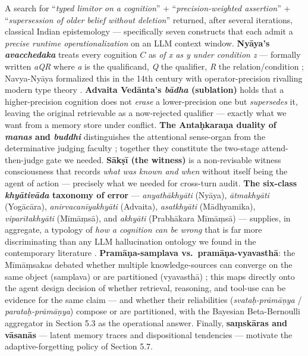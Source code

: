 A search for ``\emph{typed limitor on a cognition}'' + ``\emph{precision-weighted assertion}'' + ``\emph{supersession of older belief without deletion}'' returned, after several iterations, classical Indian epistemology --- specifically seven constructs that each admit a \emph{precise runtime operationalization} on an LLM context window. \textbf{Nyāya's \emph{avacchedaka}} treats every cognition \(C\) as \emph{of x as y under condition z} --- formally written \emph{aQR} where \emph{a} is the qualificand, \emph{Q} the qualifier, \emph{R} the relation/condition \citep{matilal1986perception, matilal1968navyanyaya, ingalls1951materials, phillips2012epistemology, gangesa14tattvacintamani}; Navya-Nyāya formalized this in the 14th century with operator-precision rivalling modern type theory \citep{ganeri2001philosophy, guha1968navyanyaya, ingalls1951materials}. \textbf{Advaita Vedānta's \emph{bādha} (sublation)} holds that a higher-precision cognition does not \emph{erase} a lower-precision one but \emph{supersedes} it, leaving the original retrievable as a now-rejected qualifier \citep{deutsch1969advaita, dharmaraja17vedantaparibhasa, shaw1990bada, rambachan2006advaita} --- exactly what we want from a memory store under conflict. \textbf{The Antaḥkaraṇa duality of \emph{manas} and \emph{buddhi}} distinguishes the attentional sense-organ from the determinative judging faculty \citep{deutsch1969advaita, datta1932advaita, ramprasad2013advaita}; together they constitute the two-stage attend-then-judge gate we needed. \textbf{Sākṣī (the witness)} is a non-revisable witness consciousness that records \emph{what was known and when} without itself being the agent of action \citep{ganeri2017concealed, indich1980consciousness, fasching2009witness, sankaraupadesha} --- precisely what we needed for cross-turn audit. \textbf{The six-class \emph{khyātivāda} taxonomy of error} --- \emph{anyathākhyāti} (Nyāya), \emph{ātmakhyāti} (Yogācāra), \emph{anirvacanīyakhyāti} (Advaita), \emph{asatkhyāti} (Mādhyamika), \emph{viparītakhyāti} (Mīmāṃsā), and \emph{akhyāti} (Prabhākara Mīmāṃsā) --- supplies, in aggregate, a typology of \emph{how a cognition can be wrong} that is far more discriminating than any LLM hallucination ontology we found in the contemporary literature \citep{ram2007error, matilal1986perception, bhatt1989prabhakara, datta1932advaita, bilimoria2018epistemology, mohanty1992reason}. \textbf{Pramāṇa-samplava vs.~pramāṇa-vyavasthā}: the Mīmāṃsakas debated whether multiple knowledge-sources can converge on the same object (samplava) or are partitioned (vyavasthā) \citep{guha2016svatahpramanya, dasti2008jayanta, dasti2012perception, bhattacharyya1988svatahprama}; this maps directly onto the agent design decision of whether retrieval, reasoning, and tool-use can be evidence for the same claim --- and whether their reliabilities (\emph{svataḥ-prāmāṇya} / \emph{parataḥ-prāmāṇya}) compose or are partitioned, with the Bayesian Beta-Bernoulli aggregator in Section 5.3 as the operational answer. Finally, \textbf{saṃskāras and vāsanās} --- latent memory traces and dispositional tendencies \citep{deutsch1969advaita, sankaraupadesha, halbfass1991traditioncomparison} --- motivate the adaptive-forgetting policy of Section 5.7.

